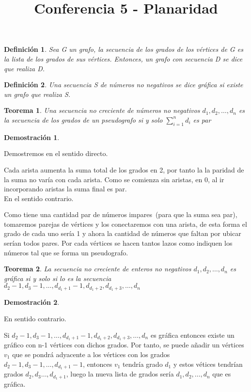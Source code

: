 \documentclass[a4paper,1pt]{report}
\title{Conferencia 5 - Planaridad}
\author{}
\newtheorem*{teo}{Teorema}
\newtheorem*{dem}{Demostración}
\newtheorem*{dfn}{Definición}
\begin{document}
\maketitle


\begin{dfn}
 Sea G un grafo, la secuencia de los grados de los vértices de G es la lista de los grados de sus vértices. Entonces, un grafo con secuencia D se dice que realiza D.
\end{dfn}

\begin{dfn}
 Una secuencia S de números no negativos se dice gráfica si existe un grafo que realiza S.
\end{dfn}

\begin{teo}
 Una secuencia no creciente de números no negativos $d_1,d_2,\dots,d_n$ es la secuencia de los grados de un pseudografo si y solo $\sum^n_{i=1}d_i$ es par
\end{teo}

\begin{dem}
\end{dem}


Demostremos en el sentido directo.

Cada arista aumenta la suma total de los grados en 2, por tanto la la paridad de la suma no varía con cada arista. Como se comienza sin aristas, en 0, al ir incorporando aristas la suma final es par.\\

En el sentido contrario.

Como tiene una cantidad par de números impares~(para que la suma sea par), tomaremos parejas de vértices y los conectaremos con una arista, de esta forma el grado de cada uno sería 1 y ahora la cantidad de números que faltan por ubicar serían todos pares. Por cada vértices se hacen tantos lazos como indiquen los números tal que se forma un pseudografo.

\begin{teo}
 La secuencia no creciente de enteros no negativos $d_1,d_2,\dots,d_n$ es gráfica si y solo si lo es la secuencia 
 $d_2-1,d_3-1,\dots,d_{d_1+1}-1,d_{d_1+2},d_{d_1+3},\dots,d_n$
\end{teo}

\begin{dem}

\end{dem}

En sentido contrario.

Si $d_2-1,d_3-1,\dots,d_{d_1+1}-1,d_{d_1+2},d_{d_1+3},\dots,d_n$ es gráfica entonces existe un gráfico con n-1 vértices con dichos grados. Por tanto, se puede añadir un vértices $v_1$ que se pondrá adyacente a los vértices con los grados $d_2-1,d_3-1,\dots,d_{d_1+1}-1$, entonces $v_1$ tendría grado $d_1$ y estos vétices tendrían grados $d_2,d_3\dots,d_{d_1+1}$, luego la nueva lista de grados sería $d_1,d_2,\dots,d_n$ que es gráfica.\\
\end{document}
